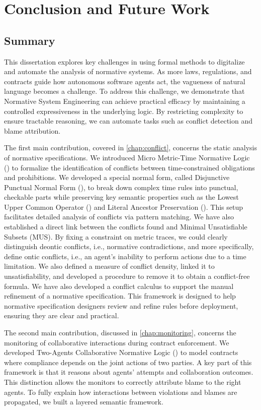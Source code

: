
\chapter{Conclusion and Future Work}
\label{chapter:conclusion}

\section{Summary}
This dissertation explores key challenges in using formal methods to digitalize and automate the analysis of normative systems. As more laws, regulations, and contracts guide how autonomous software agents act, the vagueness of natural language becomes a challenge. To address this challenge, we demonstrate that Normative System Engineering can achieve practical efficacy by maintaining a controlled expressiveness in the underlying logic. By restricting complexity to ensure tractable reasoning, we can automate tasks such as conflict detection and blame attribution.

The first main contribution, covered in \ref{chap:conflict}, concerns the static analysis of normative specifications. We introduced Micro Metric-Time Normative Logic (\TDDLfm) to formalize the identification of conflicts between time-constrained obligations and prohibitions. We developed a special normal form, called Disjunctive Punctual Normal Form (\dpnf), to break down complex time rules into punctual, checkable parts while preserving key semantic properties such as the Lowest Upper Common Operator (\LUCO) and Literal Ancestor Preservation (\LAP). This setup facilitates detailed analysis of conflicts via pattern matching. We have also established a direct link between the conflicts found and Minimal Unsatisfiable Subsets (MUS). By fixing a constraint on metric traces, we could clearly distinguish deontic conflicts, i.e., normative contradictions, and more specifically, define ontic conflicts, i.e., an agent's inability to perform actions due to a time limitation. We also defined a measure of conflict density, linked it to unsatisfiability, and developed a procedure to remove it to obtain a conflict-free formula. We have also developed a conflict calculus to support the manual refinement of a normative specification. This framework is designed to help normative specification designers review and refine rules before deployment, ensuring they are clear and practical.

The second main contribution, discussed in \ref{chap:monitoring}, concerns the monitoring of collaborative interactions during contract enforcement. We developed Two-Agents Collaborative Normative Logic (\cDL) to model contracts where compliance depends on the joint actions of two parties. A key part of this framework is that it reasons about agents' attempts and collaboration outcomes. This distinction allows the monitors to correctly attribute blame to the right agents. To fully explain how interactions between violations and blames are propagated, we built a layered semantic framework.


